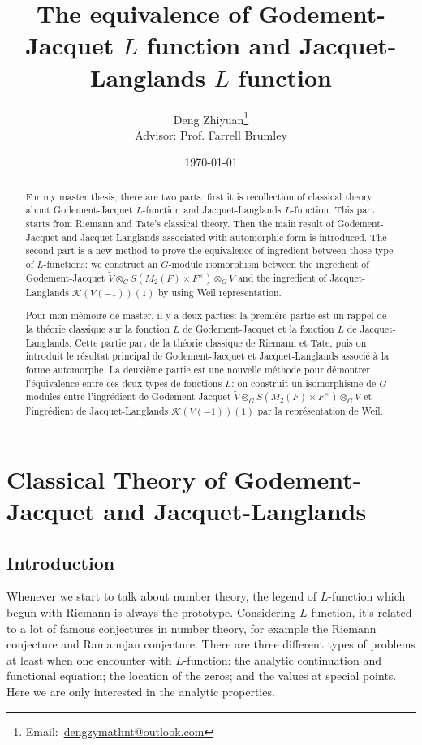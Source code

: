 \documentclass[12pt,a4paper,english]{article}
\title{The equivalence of Godement-Jacquet $L$ function and Jacquet-Langlands $L$ function}
\date{\today}
\author{Deng Zhiyuan\footnote{Email:\ \href{mailto:dengzymathnt@outlook.com}{dengzymathnt@outlook.com}} \\[0.5cm]{\small Advisor: Prof. Farrell Brumley}}
\theoremstyle{plain}
\theoremstyle{definition}
\begin{document}
\maketitle
\newpage

\tableofcontents
\newpage

\begin{abstract}
For my master thesis, there are two parts: first it is recollection of classical theory about Godement-Jacquet $L$-function and Jacquet-Langlands $L$-function. This part starts from Riemann and Tate's classical theory. Then the main result of Godement-Jacquet and Jacquet-Langlands associated with automorphic form is introduced. The second part is a new method to prove the equivalence of ingredient between those type of $L$-functions: we construct an $G$-module isomorphism between the ingredient of Godement-Jacquet $\widetilde{V}\otimes_{G}S(M_{2}(F)\times F^{\times})\otimes_{G}V$ and the ingredient of Jacquet-Langlands $\mathcal{K}(V(-1))(1)$ by using Weil representation.
\end{abstract}
\begin{abstract}
Pour mon mémoire de master, il y a deux parties: la première partie est un rappel de la théorie classique sur la fonction $L$ de Godement-Jacquet et la fonction $L$ de Jacquet-Langlands. Cette partie part de la théorie classique de Riemann et Tate, puis on introduit le résultat principal de Godement-Jacquet et Jacquet-Langlands associé à la forme automorphe. La deuxième partie est une nouvelle méthode pour démontrer l'équivalence entre ces deux types de fonctions $L$: on construit un isomorphisme de $G$-modules entre l'ingrédient de Godement-Jacquet $\widetilde{V}\otimes_{G}S( M_{2}(F)\times F^{\times})\otimes_{G}V$ et l'ingrédient de Jacquet-Langlands $\mathcal{K}(V(-1))(1)$ par la représentation de Weil.
\end{abstract}
\newpage

\vspace{0.5cm}
\section{Classical Theory of Godement-Jacquet and Jacquet-Langlands}
\subsection{Introduction}
Whenever we start to talk about number theory, the legend of $L$-function which begun with Riemann is always the prototype. Considering $L$-function, it's related to a lot of famous conjectures in number theory, for example the Riemann conjecture and Ramanujan conjecture. There are three different types of problems at least when one encounter with $L$-function: the analytic continuation and functional equation; the location of the zeros; and the values at special points. Here we are only interested in the analytic properties.
\end{document}
